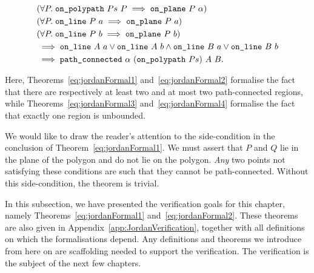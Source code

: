 \begin{equation}
  \begin{split}\label{eq:jordanFormal4}
  &(\forall P.\; \code{on\_polypath}\ Ps\ P \implies \code{on\_plane}\ P\ \alpha)\\
  &(\forall P.\; \code{on\_line}\ P\ a \implies \code{on\_plane}\ P\ a)\\
  &(\forall P.\; \code{on\_line}\ P\ b \implies \code{on\_plane}\ P\ b)\\
  &\implies \code{on\_line}\ A\ a \vee \code{on\_line}\ A\ b\wedge 
  \code{on\_line}\ B\ a \vee \code{on\_line}\ B\ b\\
  &\implies \code{path\_connected}\ \alpha\ (\code{on\_polypath}\ Ps)\ A\ B.
\end{split}
\end{equation}

Here, Theorems~\ref{eq:jordanFormal1} and~\ref{eq:jordanFormal2} formalise the fact that there are respectively at least two and at most two path-connected regions, while Theorems~\ref{eq:jordanFormal3} and~\ref{eq:jordanFormal4} formalise the fact that exactly one region is unbounded.

We would like to draw the reader's attention to the side-condition in the conclusion of Theorem~\ref{eq:jordanFormal1}. We must assert that $P$ and $Q$ lie in the plane of the polygon and do not lie on the polygon. \emph{Any} two points not satisfying these conditions are such that they cannot be path-connected. Without this side-condition, the theorem is trivial.

In this subsection, we have presented the verification goals for this chapter, namely Theorems~\ref{eq:jordanFormal1} and~\ref{eq:jordanFormal2}. These theorems are also given in Appendix~\ref{app:JordanVerification}, together with all definitions on which the formalisations depend. Any definitions and theorems we introduce from here on are scaffolding needed to support the verification. The verification is the subject of the next few chapters.


